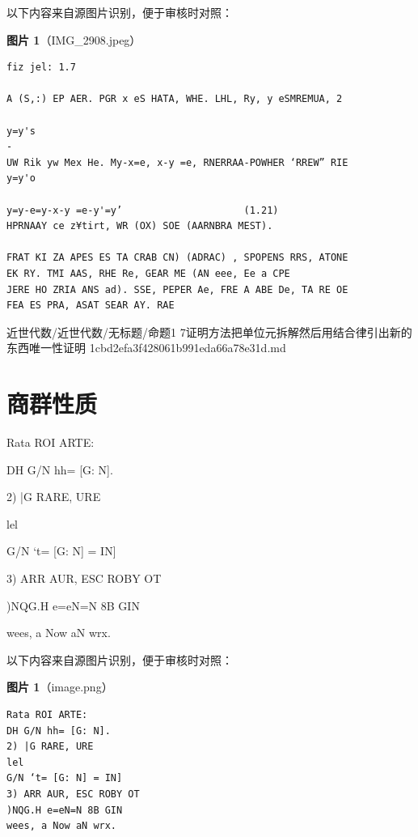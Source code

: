 \begin{note}
以下内容来自源图片识别，便于审核时对照：

\textbf{图片 1}（IMG\_2908.jpeg）
\begin{Verbatim}[fontsize=\small]
fiz jel: 1.7

A (S,:) EP AER. PGR x eS HATA, WHE. LHL, Ry, y eSMREMUA, 2

y=y's                                                                                                        -
UW Rik yw Mex He. My-x=e, x-y =e, RNERRAA-POWHER ‘RREW” RIE
y=y'o

y=y-e=y-x-y =e-y'=y’                     (1.21)
HPRNAAY ce z¥tirt, WR (OX) SOE (AARNBRA MEST).

FRAT KI ZA APES ES TA CRAB CN) (ADRAC) , SPOPENS RRS, ATONE
EK RY. TMI AAS, RHE Re, GEAR ME (AN eee, Ee a CPE
JERE HO ZRIA ANS ad). SSE, PEPER Ae, FRE A ABE De, TA RE OE
FEA ES PRA, ASAT SEAR AY. RAE
\end{Verbatim}

\end{note}

\begin{note}[来源路径]

近世代数/近世代数/无标题/命题1 7证明方法把单位元拆解然后用结合律引出新的东西唯一性证明 1cbd2efa3f428061b991eda66a78e31d.md

\end{note}

\section*{商群性质}

\begin{note}[商群性质]

Rata ROI ARTE:

DH G/N hh= [G: N].

2) |G RARE, URE

lel

G/N ‘t= [G: N] = IN]

3) ARR AUR, ESC ROBY OT

)NQG.H e=eN=N 8B GIN

wees, a Now aN wrx.

\end{note}

\begin{note}
以下内容来自源图片识别，便于审核时对照：

\textbf{图片 1}（image.png）
\begin{Verbatim}[fontsize=\small]
Rata ROI ARTE:
DH G/N hh= [G: N].
2) |G RARE, URE
lel
G/N ‘t= [G: N] = IN]
3) ARR AUR, ESC ROBY OT
)NQG.H e=eN=N 8B GIN
wees, a Now aN wrx.
\end{Verbatim}

\end{note}

